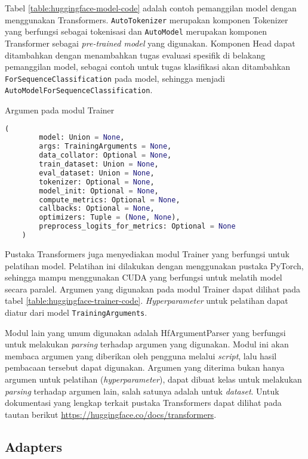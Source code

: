 Tabel \ref{table:huggingface-model-code} adalah contoh pemanggilan model dengan menggunakan Transformers. \texttt{AutoTokenizer} merupakan komponen Tokenizer yang berfungsi sebagai tokenisasi dan \texttt{AutoModel} merupakan komponen Transformer sebagai \textit{pre-trained model} yang digunakan. Komponen Head dapat ditambahkan dengan menambahkan tugas evaluasi spesifik di belakang pemanggilan model, sebagai contoh untuk tugas klasifikasi akan ditambahkan \texttt{ForSequenceClassification} pada model, sehingga menjadi \texttt{AutoModelForSequenceClassification}.

\begin{table}[h]
    \caption{Argumen pada modul Trainer}
    \label{table:huggingface-trainer-code}
    \begin{lstlisting}[language=python]
    (
        model: Union = None,
        args: TrainingArguments = None,
        data_collator: Optional = None,
        train_dataset: Union = None,
        eval_dataset: Union = None,
        tokenizer: Optional = None,
        model_init: Optional = None,
        compute_metrics: Optional = None,
        callbacks: Optional = None,
        optimizers: Tuple = (None, None),
        preprocess_logits_for_metrics: Optional = None
    )
    \end{lstlisting}
\end{table}

Pustaka Transformers juga menyediakan modul Trainer yang berfungsi untuk pelatihan model. Pelatihan ini dilakukan dengan menggunakan pustaka PyTorch, sehingga mampu menggunakan CUDA yang berfungsi untuk melatih model secara paralel. Argumen yang digunakan pada modul Trainer dapat dilihat pada tabel \ref{table:huggingface-trainer-code}. \textit{Hyperparameter} untuk pelatihan dapat diatur dari model \texttt{TrainingArguments}.

Modul lain yang umum digunakan adalah HfArgumentParser yang berfungsi untuk melakukan \textit{parsing} terhadap argumen yang digunakan. Modul ini akan membaca argumen yang diberikan oleh pengguna melalui \textit{script}, lalu hasil pembacaan tersebut dapat digunakan. Argumen yang diterima bukan hanya argumen untuk pelatihan (\textit{hyperparameter}), dapat dibuat kelas untuk melakukan \textit{parsing} terhadap argumen lain, salah satunya adalah untuk \textit{dataset}. Untuk dokumentasi yang lengkap terkait pustaka Transformers dapat dilihat pada tautan berikut \url{https://huggingface.co/docs/transformers}.

\subsection{Adapters}

